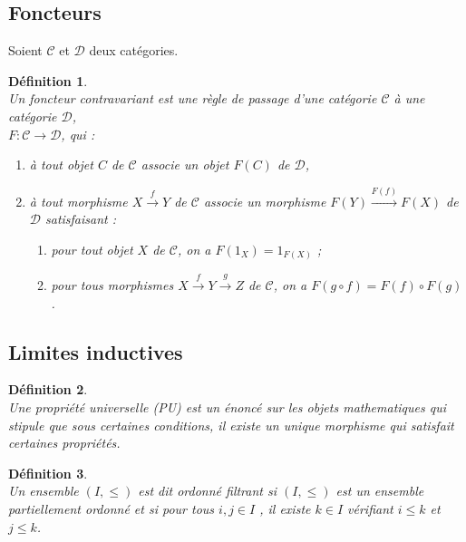 \documentclass[a4paper, 14pt]{report}
\newtheorem{definition}{Définition}[section]
\begin{document}
\begin{onehalfspace}
{			\subsection{Foncteurs}
			Soient $\mathcal{C}$ et $\mathcal{D}$ deux catégories.
			\begin{definition} \cite{maclane1971categories} \\
Un \textit{foncteur contravariant} est une règle de passage d'une catégorie $\mathcal{C}$ à une catégorie $\mathcal{D}$, \\
				$F : \mathcal{C} \to \mathcal{D}$, qui :
				\begin{enumerate} [label=\roman*)]
					\item à tout objet $C$ de $\mathcal{C}$ associe un objet $F(C)$ de $\mathcal{D}$,
					\item à tout morphisme $X \xrightarrow{f} Y$ de $\mathcal{C}$ associe un morphisme $F(Y) \xrightarrow{F(f)} F(X)$ de $\mathcal{D}$ satisfaisant :
					\begin{enumerate}
						\item pour tout objet $X$ de $\mathcal{C}$, on a $F(1_X) = 1_{F(X)}$ ;
						\item pour tous morphismes $X \xrightarrow{f} Y \xrightarrow{g} Z$ de $\mathcal{C}$, on a $F(g \circ f) = F(f) \circ F(g)$.
					\end{enumerate}
				\end{enumerate}
			\end{definition}
			
			
			
			\subsection{ Limites inductives}
			
			\begin{definition} \cite {maclane1971categories}\\
Une propriété universelle (PU) est un énoncé sur les objets mathematiques qui stipule que sous certaines conditions, il existe un unique morphisme qui satisfait certaines propriétés.
			\end{definition}
			

			\begin{definition} \cite{ribes-zalesskii} \\
Un ensemble $(I,\leq)$ est dit ordonné filtrant si $(I,\leq)$ est un ensemble  partiellement ordonné et si pour tous $i,j \in I$ , il existe $k \in I$ vérifiant $i \leq k$ et $j \leq k$.
			\end{definition}
			
}
\end{onehalfspace}
\end{document}
